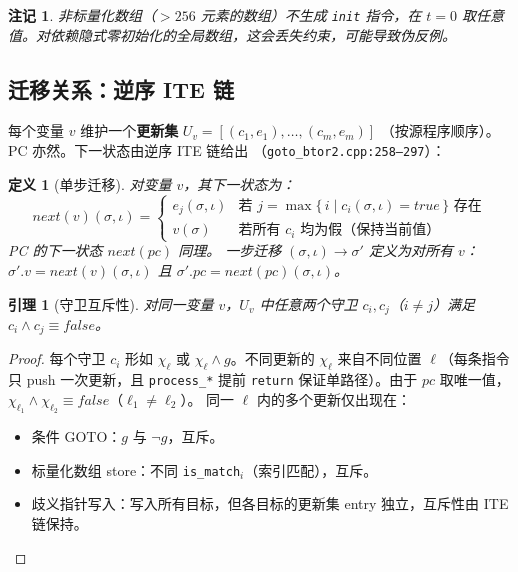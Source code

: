 \documentclass[11pt,a4paper]{article}
\newtheorem{definition}{定义}[section]
\newtheorem{lemma}{引理}[section]
\newtheorem{remark}{注记}[section]
\newcommand{\guard}{\chi}
\newcommand{\nextv}[1]{\mathit{next}(#1)}
\newcommand{\nextpc}{\nextv{\mathit{pc}}}
\newcommand{\True}{\mathit{true}}
\newcommand{\False}{\mathit{false}}
\begin{document}
\begin{remark}
  非标量化数组（$>256$ 元素的数组）不生成 \texttt{init} 指令，在 $t{=}0$
  取任意值。对依赖隐式零初始化的全局数组，这会丢失约束，可能导致伪反例。
\end{remark}

\subsection{迁移关系：逆序 ITE 链}

每个变量 $v$ 维护一个\textbf{更新集} $U_v = [(c_1, e_1),\ldots,(c_m, e_m)]$
（按源程序顺序）。PC 亦然。下一状态由逆序 ITE 链给出
（\texttt{goto\_btor2.cpp:258--297}）：

\begin{definition}[单步迁移]
  \label{def:transition}
  对变量 $v$，其下一状态为：
  \[
    \nextv{v}(\sigma, \iota) =
    \begin{cases}
      e_j(\sigma, \iota) & \text{若 } j = \max\{\,i \mid c_i(\sigma,\iota) = \True\,\} \text{ 存在} \\
      v(\sigma) & \text{若所有 } c_i \text{ 均为假（保持当前值）}
    \end{cases}
  \]
  PC 的下一状态 $\nextpc$ 同理。
  一步迁移 $(\sigma, \iota) \to \sigma'$ 定义为对所有 $v$：
  $\sigma'.v = \nextv{v}(\sigma, \iota)$ 且 $\sigma'.\mathit{pc} = \nextpc(\sigma, \iota)$。
\end{definition}

\begin{lemma}[守卫互斥性]
  \label{lem:mutex}
  对同一变量 $v$，$U_v$ 中任意两个守卫 $c_i, c_j$（$i \neq j$）满足
  $c_i \wedge c_j \equiv \False$。
\end{lemma}

\begin{proof}
  每个守卫 $c_i$ 形如 $\guard_\ell$ 或 $\guard_\ell \wedge g$。不同更新的
  $\guard_\ell$ 来自不同位置 $\ell$（每条指令只 push 一次更新，且
  \texttt{process\_*} 提前 \texttt{return} 保证单路径）。由于 $\mathit{pc}$
  取唯一值，$\guard_{\ell_1} \wedge \guard_{\ell_2} \equiv \False$（$\ell_1 \neq \ell_2$）。
  同一 $\ell$ 内的多个更新仅出现在：
  \begin{itemize}
    \item 条件 GOTO：$g$ 与 $\neg g$，互斥。
    \item 标量化数组 store：不同 \texttt{is\_match}$_i$（索引匹配），互斥。
    \item 歧义指针写入：写入所有目标，但各目标的更新集 entry 独立，互斥性由 ITE 链保持。
  \end{itemize}
\end{proof}
\end{document}
